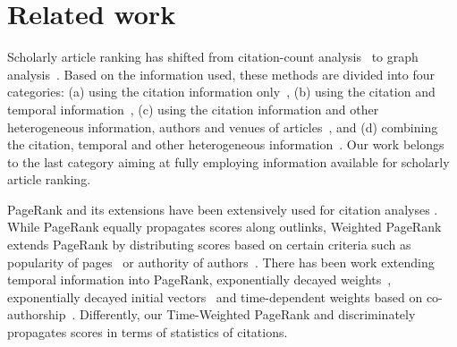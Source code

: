 
\section{Related work} \label{sec-related}



Scholarly article ranking has shifted from citation-count analysis~\cite{Garfield471,Hirsch15112005} to graph analysis~\cite{Waltman2014,Jiang12-MRank,Liang16AAAI,Li08TSRanking,Wang13AAAI,WalkerXKM07,sayyadi09,
Wang16TIST,Ng11KDD}.
Based on the information used, these methods are divided into four categories: (a) using the citation information only~\cite{Garfield471,Hirsch15112005,Ng11KDD}, (b) using the citation and temporal information~\cite{Li08TSRanking,WalkerXKM07}, (c) using the citation information and other heterogeneous information, \eg authors and venues of articles~\cite{Jiang12-MRank,Liang16AAAI}, and (d) combining the citation, temporal and other heterogeneous information~\cite{sayyadi09,Wang16TIST,Wang13AAAI}.
Our work belongs to the last category aiming at fully employing information available for scholarly article ranking.
%



PageRank \cite{Brin98:PageRank} and its extensions have been extensively used for citation analyses \cite{Waltman2014}. While PageRank equally propagates scores along outlinks, Weighted PageRank extends PageRank by distributing scores based on certain criteria such as popularity of pages~\cite{Xing04:WPR} or authority of authors~\cite{Ding11}.
There has been work extending temporal information into PageRank, \eg exponentially decayed weights~\cite{Li08TSRanking}, exponentially decayed initial vectors~\cite{WalkerXKM07} and time-dependent weights based on co-authorship~\cite{FIALA2012370}.
Differently, our Time-Weighted PageRank  and discriminately propagates scores in terms of statistics of citations.


